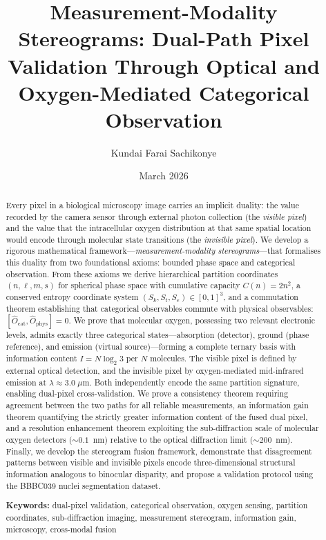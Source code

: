 \documentclass[11pt,twocolumn,a4paper]{article}
\title{\textbf{Measurement-Modality Stereograms: Dual-Path Pixel Validation Through Optical and Oxygen-Mediated Categorical Observation}}
\author{Kundai Farai Sachikonye}
\affil{Independent Researcher}
\date{March 2026}
\newcommand{\Ocat}{\hat{O}_{\mathrm{cat}}}
\newcommand{\Ophys}{\hat{O}_{\mathrm{phys}}}
\newcommand{\Sk}{S_k}
\newcommand{\St}{S_t}
\newcommand{\Se}{S_e}
\begin{document}
\maketitle
\thispagestyle{fancy}

\begin{abstract}
Every pixel in a biological microscopy image carries an implicit duality: the value recorded by the camera sensor through external photon collection (the \emph{visible pixel}) and the value that the intracellular oxygen distribution at that same spatial location would encode through molecular state transitions (the \emph{invisible pixel}).
We develop a rigorous mathematical framework---\emph{measurement-modality stereograms}---that formalises this duality from two foundational axioms: bounded phase space and categorical observation.
From these axioms we derive hierarchical partition coordinates $(n, \ell, m, s)$ for spherical phase space with cumulative capacity $C(n)=2n^2$, a conserved entropy coordinate system $(\Sk, \St, \Se) \in [0,1]^3$, and a commutation theorem establishing that categorical observables commute with physical observables: $[\Ocat, \Ophys] = 0$.
We prove that molecular oxygen, possessing two relevant electronic levels, admits exactly three categorical states---absorption (detector), ground (phase reference), and emission (virtual source)---forming a complete ternary basis with information content $I = N\log_2 3$ per $N$ molecules.
The visible pixel is defined by external optical detection, and the invisible pixel by oxygen-mediated mid-infrared emission at $\lambda \approx 3.0\;\mu$m.
Both independently encode the same partition signature, enabling dual-pixel cross-validation.
We prove a consistency theorem requiring agreement between the two paths for all reliable measurements, an information gain theorem quantifying the strictly greater information content of the fused dual pixel, and a resolution enhancement theorem exploiting the sub-diffraction scale of molecular oxygen detectors (${\sim}0.1$~nm) relative to the optical diffraction limit (${\sim}200$~nm).
Finally, we develop the stereogram fusion framework, demonstrate that disagreement patterns between visible and invisible pixels encode three-dimensional structural information analogous to binocular disparity, and propose a validation protocol using the BBBC039 nuclei segmentation dataset.

\medskip
\noindent\textbf{Keywords:} dual-pixel validation, categorical observation, oxygen sensing, partition coordinates, sub-diffraction imaging, measurement stereogram, information gain, microscopy, cross-modal fusion
\end{abstract}
\end{document}
